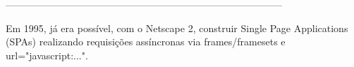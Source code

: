 ------------------------------------------------------------------------------------

Em 1995, já era possível, com o Netscape 2, construir Single Page Applications (SPAs) realizando requisições assíncronas via frames/framesets e url="javascript:...".












